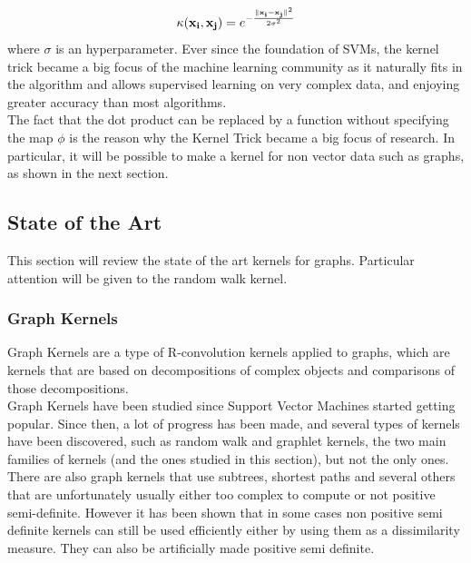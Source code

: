 \documentclass{article}
\DeclarePairedDelimiter{\norm}{\lVert}{\rVert}
\let\vec\mathbf
\theoremstyle{definition}
\begin{document}
\begin{equation}
	\label{eq:rbf}
	\kappa(\vec{x_{i}},\vec{x_{j}})={e}^{-\frac{\norm{\vec{x_{i}}-\vec{x_{j}}}^{2}}{2\sigma^{2}}}
\end{equation}
where $\sigma$ is an hyperparameter.
Ever since the foundation of SVMs, the kernel trick became a big focus of the machine learning community as it naturally fits in the algorithm and allows supervised learning on very complex data, and enjoying greater accuracy than most algorithms.\\
The fact that the dot product can be replaced by a function without specifying the map $\phi$ is the reason why the Kernel Trick became a big focus of research. In particular, it will be possible to make a kernel for non vector data such as graphs, as shown in the next section. 
\subsection{State of the Art}
This section will review the state of the art kernels for graphs. Particular attention will be given to the random walk kernel.
\subsubsection{Graph Kernels}
Graph Kernels are a type of R-convolution kernels\cite{haussler99convolution} applied to graphs, which are kernels that are based on decompositions of complex objects and comparisons of those decompositions.\\
Graph Kernels have been studied since Support Vector Machines started getting popular\cite{kashima_graphkers_2003}. Since then, a lot of progress has been made, and several types of kernels have been discovered, such as random walk and graphlet\cite{shervashidze_efficient_2009} kernels, the two main families of kernels (and the ones studied in this section), but not the only ones.
There are also graph kernels that use subtrees\cite{ramon2003expressivity}, shortest paths\cite{borgwardt2005shortest} and several others that are unfortunately usually  either too complex to compute or not positive semi-definite\cite{shervashidze2012scalable}. However it has been shown\cite{schlkopf_learning_2001} that in some cases non positive semi definite kernels can still be used efficiently either by using them as a dissimilarity measure. They can also be artificially made positive semi definite.
\end{document}
